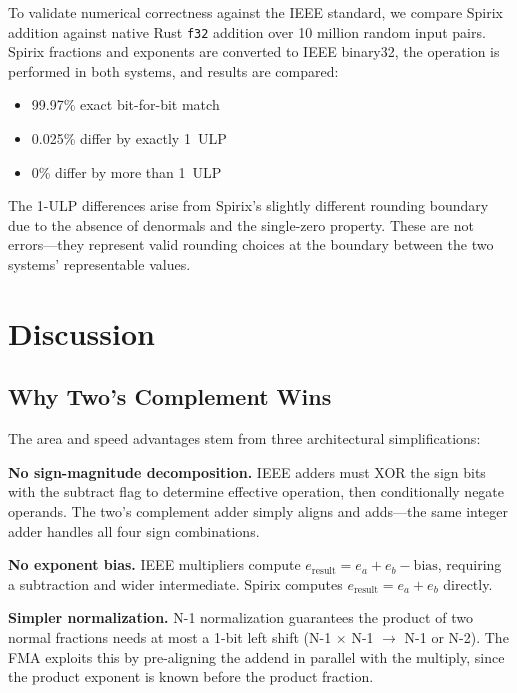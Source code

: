 \documentclass[10pt,twocolumn]{article}
\begin{document}
To validate numerical correctness against the IEEE standard, we compare
Spirix addition against native Rust \texttt{f32} addition over 10 million
random input pairs.  Spirix fractions and exponents are converted to
IEEE binary32, the operation is performed in both systems, and results
are compared:

\begin{itemize}
  \item 99.97\% exact bit-for-bit match
  \item 0.025\% differ by exactly 1~ULP
  \item 0\% differ by more than 1~ULP
\end{itemize}

The 1-ULP differences arise from Spirix's slightly different rounding
boundary due to the absence of denormals and the single-zero property.
These are not errors---they represent valid rounding choices at the
boundary between the two systems' representable values.

\section{Discussion}
\label{sec:discussion}

\subsection{Why Two's Complement Wins}

The area and speed advantages stem from three architectural
simplifications:

\textbf{No sign-magnitude decomposition.}  IEEE adders must XOR the
sign bits with the subtract flag to determine effective operation,
then conditionally negate operands.  The two's complement adder simply
aligns and adds---the same integer adder handles all four sign
combinations.

\textbf{No exponent bias.}  IEEE multipliers compute
$e_{\text{result}} = e_a + e_b - \text{bias}$, requiring a subtraction
and wider intermediate.  Spirix computes $e_{\text{result}} = e_a + e_b$
directly.

\textbf{Simpler normalization.}  N-1 normalization guarantees the
product of two normal fractions needs at most a 1-bit left shift
(N-1 $\times$ N-1 $\to$ N-1 or N-2).  The FMA exploits this by
pre-aligning the addend in parallel with the multiply, since the
product exponent is known before the product fraction.
\end{document}
